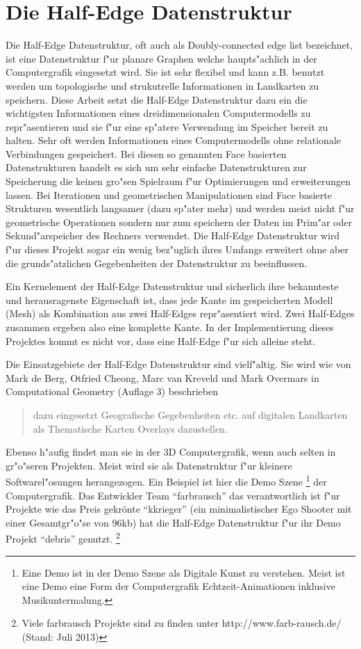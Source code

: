 \documentclass[pagesize, paper=a4, fontsize=12pt,titlepage=true, headings=small, headnosepline, abstractoff, liststotoc, nochapterprefix, plainheadsepline]{scrreprt}
\newcommand{\HES}{Half-Edge Datenstruktur }
\begin{document}
	\section {Die \HES}
		Die Half-Edge Datenstruktur, oft auch als Doubly-connected edge list bezeichnet, ist eine Datenstruktur f"ur planare Graphen welche haupts"achlich in der Computergrafik eingesetzt wird. Sie ist sehr flexibel und kann z.B. benutzt werden um topologische und strukutrelle Informationen in Landkarten zu speichern. Diese Arbeit setzt die \HES dazu ein die wichtigsten Informationen eines dreidimensionalen Computermodells zu repr"asentieren und sie f"ur eine sp"atere Verwendung im Speicher bereit zu halten. Sehr oft werden Informationen eines Computermodells ohne relationale Verbindungen gespeichert. Bei diesen so genannten Face basierten Datenstrukturen handelt es sich um sehr einfache Datenstrukturen zur Speicherung die keinen gro"sen Spielraum f"ur Optimierungen und erweiterungen lassen. Bei Iterationen und geometrischen Manipulationen sind Face basierte Strukturen wesentlich langsamer (dazu sp"ater mehr) und werden meist nicht f"ur geometrische Operationen sondern nur zum speichern der Daten im Prim"ar oder Sekund"arspeicher des Rechners verwendet. Die \HES wird f"ur dieses Projekt sogar ein wenig bez"uglich ihres Umfangs erweitert ohne aber die grunds"atzlichen Gegebenheiten der Datenstruktur zu beeinflussen.

Ein Kernelement der \HES und sicherlich ihre bekannteste und herausragenste Eigenschaft ist, dass jede Kante im gespeicherten Modell (Mesh) als Kombination aus zwei Half-Edges repr"asentiert wird. Zwei Half-Edges zusammen ergeben also eine komplette Kante. In der Implementierung dieses Projektes kommt es nicht vor, dass eine Half-Edge f"ur sich alleine steht.

Die Einsatzgebiete der \HES sind vielf"altig. Sie wird wie von Mark de Berg, Otfried Cheong, Marc van Kreveld und Mark Overmars in Computational Geometry \cite{vanMarkdeBerg.2008} (Auflage 3) beschrieben  \begin{quote}dazu eingesetzt Geografische Gegebenheiten etc. auf digitalen Landkarten  als Thematische Karten Overlays dazustellen. \cite[S.~29]{vanMarkdeBerg.2008}\end{quote} Ebenso h"aufig findet man sie in der 3D Computergrafik, wenn auch selten in gr"o"seren Projekten. Meist wird sie als Datenstruktur f"ur kleinere Softwarel"osungen herangezogen. Ein Beispiel ist hier die Demo Szene \footnote[1]{Eine Demo ist in der Demo Szene als Digitale Kunst zu verstehen. Meist ist eine Demo eine Form der Computergrafik Echtzeit-Animationen inklusive Musikuntermalung.} der Computergrafik. Das Entwickler Team "`farbrausch"' das verantwortlich ist f"ur Projekte wie das Preis gekrönte "`kkrieger"' (ein minimalistischer Ego Shooter mit einer Gesamtgr"o"se von 96kb) hat die \HES f"ur ihr Demo Projekt "`debris"' genutzt. \footnote[2]{Viele farbrausch Projekte sind zu finden unter http://www.farb-rausch.de/ (Stand: Juli 2013)}
\end{document}
